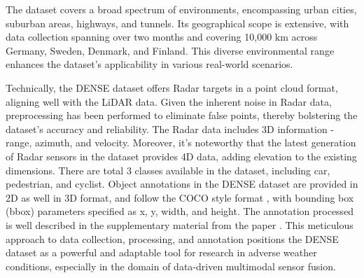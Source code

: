\documentclass[report.tex]{subfiles}
\begin{document}
    The dataset covers a broad spectrum of environments, encompassing urban cities, suburban areas, highways, and tunnels. Its geographical scope is extensive, with data collection spanning over two months and covering 10,000 km across Germany, Sweden, Denmark, and Finland. This diverse environmental range enhances the dataset's applicability in various real-world scenarios.

    Technically, the DENSE dataset offers Radar targets in a point cloud format, aligning well with the LiDAR data. Given the inherent noise in Radar data, preprocessing has been performed to eliminate false points, thereby bolstering the dataset's accuracy and reliability. The Radar data includes 3D information - range, azimuth, and velocity. Moreover, it's noteworthy that the latest generation of Radar sensors in the dataset provides 4D data, adding elevation to the existing dimensions. There are total 3 classes available in the dataset, including car, pedestrian, and cyclist. Object annotations in the DENSE dataset are provided in 2D as well in 3D format, and follow the COCO style format \cite{lin2014microsoft}, with bounding box (bbox) parameters specified as x, y, width, and height. The annotation processed is well described in the supplementary material from the paper \cite{heide2023adverseweatherfusion}. This meticulous approach to data collection, processing, and annotation positions the DENSE dataset as a powerful and adaptable tool for research in adverse weather conditions, especially in the domain of data-driven multimodal sensor fusion.


\end{document}
